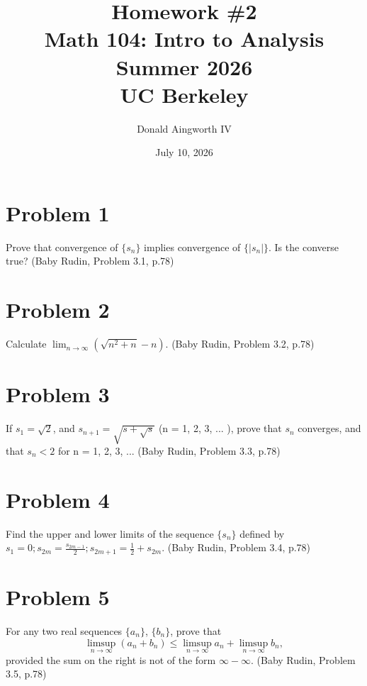 \documentclass[11pt]{article}
\title{Homework \#2\\{\large Math 104: Intro to Analysis \\ Summer 2026} \\ {\normalsize UC Berkeley}}
\date{July 10, 2026}
\author{Donald Aingworth IV}
\begin{document}
\renewcommand\qedsymbol{OE$\Delta$}
\newcommand{\abs}[1]{\left| #1 \right|}
\newcommand{\andtxt}{\text{ and }}
\newcommand{\Ais}{\ensuremath{\overset{A}{=}}}
\newcommand{\Cis}{\ensuremath{\overset{C}{=}}}
\newcommand{\closure}[1]{\ensuremath{\overline{#1}}}
\newcommand{\encircle}[1]{%
  \tikz[baseline=(char.base)]{%
    \node[shape=circle, draw, inner sep=1pt] (char) {#1};%
  }%
}
\newcommand{\mathif}{\text{if }}
\newcommand{\seq}[2][n]{\ensuremath{(#2 _{#1})}}
\newcommand{\zz}[1]{$\mathbb{Z}/ #1 \mathbb{Z}$}

\section{Problem 1}
Prove that convergence of $\{s_n\}$ implies convergence of $\{\abs{s_n}\}$. Is the converse true?
(Baby Rudin, Problem 3.1, p.78)

\pagebreak
\section{Problem 2}
Calculate $\lim_{n \to \infty} \left( \sqrt{n^2 + n} - n \right)$.
(Baby Rudin, Problem 3.2, p.78)

\pagebreak
\section{Problem 3}
If $s_1 = \sqrt{2}$, and $s_{n + 1} = \sqrt{s + \sqrt{s}}$ (n = 1, 2, 3, ... ), prove that ${s_n}$ converges, and that $s_n < 2$ for n = 1, 2, 3, ...
(Baby Rudin, Problem 3.3, p.78)

\pagebreak
\section{Problem 4}
Find the upper and lower limits of the sequence $\{s_n\}$ defined by $s_1 = 0; s_{2m} = \frac{s_{2m - 1}}{2}; s_{2m + 1} = \frac{1}{2} + s_{2m}$.
(Baby Rudin, Problem 3.4, p.78)

\pagebreak
\section{Problem 5}
For any two real sequences $\{a_n\}$, $\{b_n\}$, prove that
\begin{equation}
    \limsup_{n \to \infty} (a_n + b_n) \leq \limsup_{n \to \infty} a_n + \limsup_{n \to \infty} b_n,
\end{equation}
provided the sum on the right is not of the form $\infty - \infty$.
(Baby Rudin, Problem 3.5, p.78)
\end{document}
